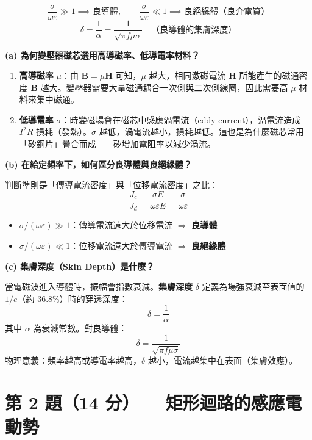 \documentclass[12pt,a4paper]{article}
\newcommand{\vB}{\mathbf{B}}
\newcommand{\vH}{\mathbf{H}}
\begin{document}
\begin{formulabox}[相關公式]
\[
  \frac{\sigma}{\omega\varepsilon} \gg 1 \implies \text{良導體}, \qquad
  \frac{\sigma}{\omega\varepsilon} \ll 1 \implies \text{良絕緣體（良介電質）}
\]
\[
  \delta = \frac{1}{\alpha} = \frac{1}{\sqrt{\pi f \mu \sigma}}
  \quad \text{（良導體的集膚深度）}
\]
\end{formulabox}

\begin{solutionbox}[詳解]
\textbf{(a) 為何變壓器磁芯選用高導磁率、低導電率材料？}

\begin{enumerate}
  \item \textbf{高導磁率} $\mu$：由 $\vB = \mu \vH$ 可知，$\mu$ 越大，相同激磁電流 $\vH$ 所能產生的磁通密度 $\vB$ 越大。變壓器需要大量磁通耦合一次側與二次側線圈，因此需要高 $\mu$ 材料來集中磁通。

  \item \textbf{低導電率} $\sigma$：時變磁場會在磁芯中感應渦電流（eddy current），渦電流造成 $I^2R$ 損耗（發熱）。$\sigma$ 越低，渦電流越小，損耗越低。這也是為什麼磁芯常用「矽鋼片」疊合而成——矽增加電阻率以減少渦流。
\end{enumerate}

\textbf{(b) 在給定頻率下，如何區分良導體與良絕緣體？}

判斷準則是「傳導電流密度」與「位移電流密度」之比：
\[
  \frac{J_c}{J_d} = \frac{\sigma E}{\omega\varepsilon E} = \frac{\sigma}{\omega\varepsilon}
\]
\begin{itemize}
  \item $\sigma / (\omega\varepsilon) \gg 1$：傳導電流遠大於位移電流 $\Rightarrow$ \textbf{良導體}
  \item $\sigma / (\omega\varepsilon) \ll 1$：位移電流遠大於傳導電流 $\Rightarrow$ \textbf{良絕緣體}
\end{itemize}

\textbf{(c) 集膚深度（Skin Depth）是什麼？}

當電磁波進入導體時，振幅會指數衰減。\textbf{集膚深度} $\delta$ 定義為場強衰減至表面值的 $1/e$（約 36.8\%）時的穿透深度：
\[
  \delta = \frac{1}{\alpha}
\]
其中 $\alpha$ 為衰減常數。對良導體：
\[
  \delta = \frac{1}{\sqrt{\pi f \mu \sigma}}
\]
物理意義：頻率越高或導電率越高，$\delta$ 越小，電流越集中在表面（集膚效應）。
\end{solutionbox}

\section{第 2 題（14 分）— 矩形迴路的感應電動勢}
\end{document}

